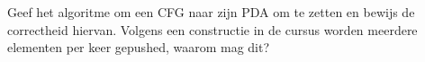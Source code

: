 \begin{question}
Geef het algoritme om een CFG naar zijn PDA om te zetten en bewijs de correctheid hiervan.
Volgens een constructie in de cursus worden meerdere elementen per keer gepushed, waarom mag dit?
\end{question}
